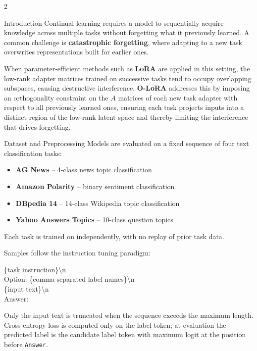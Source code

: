 \documentclass[portrait,a0,final]{a0poster}
\begin{document}
\begin{multicols}{2}

\begin{secbox}{Introduction}
\large
Continual learning requires a model to sequentially acquire knowledge across multiple tasks
without forgetting what it previously learned. A common challenge is \textbf{catastrophic forgetting},
where adapting to a new task overwrites representations built for earlier ones.

When parameter-efficient methods such as \textbf{LoRA} are applied in this setting, the low-rank
adapter matrices trained on successive tasks tend to occupy overlapping subspaces, causing
destructive interference. \textbf{O-LoRA} addresses this by imposing an orthogonality constraint
on the $A$ matrices of each new task adapter with respect to all previously learned ones,
ensuring each task projects inputs into a distinct region of the low-rank latent space and thereby
limiting the interference that drives forgetting.
\end{secbox}

\begin{secbox}{Dataset and Preprocessing}
\large
Models are evaluated on a fixed sequence of four text classification tasks:
\begin{itemize}[leftmargin=1.2em,topsep=2pt,itemsep=1pt]
  \item \textbf{AG News} -- 4-class news topic classification
  \item \textbf{Amazon Polarity} -- binary sentiment classification
  \item \textbf{DBpedia 14} -- 14-class Wikipedia topic classification
  \item \textbf{Yahoo Answers Topics} -- 10-class question topics
\end{itemize}
Each task is trained on independently, with no replay of prior task data.

Samples follow the instruction tuning paradigm:
\begin{tcolorbox}[colback=accentbg,colframe=accent,arc=2mm,boxrule=0.5pt,
                  left=8pt,right=8pt,top=4pt,bottom=4pt]
\ttfamily\small \{task instruction\}\textbackslash n\\
Option: \{comma-separated label names\}\textbackslash n\\
\{input text\}\textbackslash n\\
Answer:
\end{tcolorbox}
Only the input text is truncated when the sequence exceeds the maximum length. Cross-entropy
loss is computed only on the label token; at evaluation the predicted label is the candidate
label token with maximum logit at the position before \texttt{Answer}.
\end{secbox}


\end{multicols}
\end{document}
